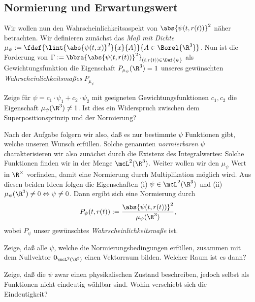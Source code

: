 \documentclass{subfiles}
\begin{document}
    \subsection{Normierung und Erwartungswert}
        Wir wollen nun den Wahrscheinlichkeitsaspekt von $\abs{\psi(t,r(t))}^2$ näher betrachten. Wir definieren zunächst das \emph{Maß mit Dichte} $\mu_\psi:=\fdef{\lint{\abs{\psi(t,x)}^2}{x}{A}}{A\in\Borel{\R^3}}$. Nun ist die Forderung von $\Gamma:=\bbra{\abs{\psi(t,r(t))}^2}_{(t,r(t))\in\Def{\psi}}$ als Gewichtungsfunktion die Eigenschaft $P_{\mu_\psi}(\R^3) = 1$ unseres gewünschten \emph{Wahrscheinlichkeitsmaßes} $P_{\mu_\psi}$ 
        \begin{Aufgabe}
            \nr{} Zeige für $\psi = c_1\cdot\psi_1 + c_2\cdot\psi_2$ mit geeigneten Gewichtungsfunktionen $c_1,c_2$ die Eigenschaft $\mu_\psi(\R^3)\neq 1$. Ist dies ein Widerspruch zwischen dem Superpositionsprinzip und der Normierung?
        \end{Aufgabe}
        Nach der Aufgabe folgern wir also, daß es nur bestimmte $\psi$ Funktionen gibt, welche unseren Wunsch erfüllen. Solche genannten \emph{normierbaren} $\psi$ charakterisieren wir also zunächst durch die Existenz des Integralwertes: Solche Funktionen finden wir in der Menge $\mcL^2(\R^3)$. Weiter wollen wir den $\mu_\psi$ Wert in $\R^\times$ vorfinden, damit eine Normierung durch Multiplikation möglich wird. Aus diesen beiden Ideen folgen die Eigenschaften (i) $\psi\in\mcL^2(\R^3)$ und (ii) $\mu_\psi(\R^3)\neq 0\Leftrightarrow \psi\neq 0$. Dann ergibt sich eine Normierung durch
        \[P_\psi(t,r(t)):=\frac{\abs{\psi(t,r(t))}^2}{\mu_\psi(\R^3)},\]
        wobei $P_{\psi}$ unser gewünschtes \emph{Wahrscheinlichkeitsmaße} ist. 
        \begin{Aufgabe}
            \nr{} Zeige, daß alle $\psi$, welche die Normierungsbedingungen erfüllen, zusammen mit dem Nullvektor $0_{\mcL^2(\R^3)}$ einen Vektorraum bilden. Welcher Raum ist es dann?

            \nr{} Zeige, daß die $\psi$ zwar einen physikalischen Zustand beschreiben, jedoch selbst als Funktionen nicht eindeutig wählbar sind. Wohin verschiebt sich die Eindeutigkeit?
        \end{Aufgabe}
\end{document}
